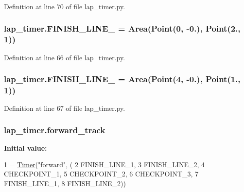 Definition at line 70 of file lap\+\_\+timer.\+py.

\subsubsection[{\texorpdfstring{F\+I\+N\+I\+S\+H\+\_\+\+L\+I\+N\+E\+\_\+1}{FINISH_LINE_1}}]{\setlength{\rightskip}{0pt plus 5cm}lap\+\_\+timer.\+F\+I\+N\+I\+S\+H\+\_\+\+L\+I\+N\+E\+\_ = {\bf Area}({\bf Point}(0, -\/0.), {\bf Point}(2., 1))}\hypertarget{namespacelap__timer_abcf675d3a6e4891c7c51cc9be2073d0c}{}\label{namespacelap__timer_abcf675d3a6e4891c7c51cc9be2073d0c}


Definition at line 66 of file lap\+\_\+timer.\+py.

\subsubsection[{\texorpdfstring{F\+I\+N\+I\+S\+H\+\_\+\+L\+I\+N\+E\+\_\+2}{FINISH_LINE_2}}]{\setlength{\rightskip}{0pt plus 5cm}lap\+\_\+timer.\+F\+I\+N\+I\+S\+H\+\_\+\+L\+I\+N\+E\+\_ = {\bf Area}({\bf Point}(4, -\/0.), {\bf Point}(1., 1))}\hypertarget{namespacelap__timer_ad3a94ca9d0504a76fc39eea4365804ad}{}\label{namespacelap__timer_ad3a94ca9d0504a76fc39eea4365804ad}


Definition at line 67 of file lap\+\_\+timer.\+py.

\subsubsection[{\texorpdfstring{forward\+\_\+track}{forward_track}}]{\setlength{\rightskip}{0pt plus 5cm}lap\+\_\+timer.\+forward\+\_\+track}\hypertarget{namespacelap__timer_a19f5402010a03485a8d1d178fffd77bb}{}\label{namespacelap__timer_a19f5402010a03485a8d1d178fffd77bb}
{\bfseries Initial value\+:}
\begin{DoxyCode}
1 = \hyperlink{classlap__timer_1_1_timer}{Timer}(\textcolor{stringliteral}{"forward"}, (
2     FINISH\_LINE\_1,
3     FINISH\_LINE\_2,
4     CHECKPOINT\_1,
5     CHECKPOINT\_2,
6     CHECKPOINT\_3,
7     FINISH\_LINE\_1,
8     FINISH\_LINE\_2))
\end{DoxyCode}


